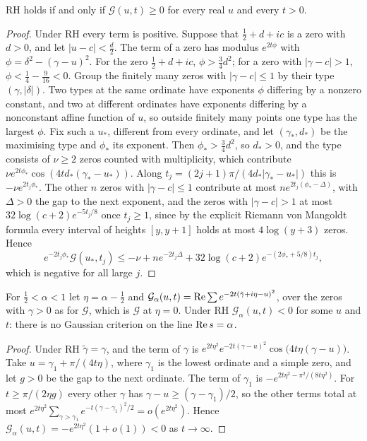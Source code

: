 \begin{proposition}\label{prop:ch12:gauss}
RH holds if and only if $\mathcal G(u,t)\ge0$ for every real $u$ and every $t>0$.
\end{proposition}

\begin{proof}
Under RH every term is positive. Suppose that $\frac12+d+ic$ is a zero with $d>0$, and let $|u-c|<\frac d2$. The term of a zero has modulus $e^{2t\phi}$ with $\phi=\delta^2-(\gamma-u)^2$. For the zero $\frac12+d+ic$, $\phi>\frac34d^2$; for a zero with $|\gamma-c|>1$, $\phi<\frac14-\frac9{16}<0$. Group the finitely many zeros with $|\gamma-c|\le1$ by their type $(\gamma,|\delta|)$. Two types at the same ordinate have exponents $\phi$ differing by a nonzero constant, and two at different ordinates have exponents differing by a nonconstant affine function of $u$, so outside finitely many points one type has the largest $\phi$. Fix such a $u_*$, different from every ordinate, and let $(\gamma_*,d_*)$ be the maximising type and $\phi_*$ its exponent. Then $\phi_*>\frac34d^2$, so $d_*>0$, and the type consists of $\nu\ge2$ zeros counted with multiplicity, which contribute $\nu e^{2t\phi_*}\cos(4td_*(\gamma_*-u_*))$. Along $t_j=(2j+1)\pi/(4d_*|\gamma_*-u_*|)$ this is $-\nu e^{2t_j\phi_*}$. The other $n$ zeros with $|\gamma-c|\le1$ contribute at most $ne^{2t_j(\phi_*-\Delta)}$, with $\Delta>0$ the gap to the next exponent, and the zeros with $|\gamma-c|>1$ at most $32\log(c+2)e^{-5t_j/8}$ once $t_j\ge1$, since by the explicit Riemann von Mangoldt formula every interval of heights $[y,y+1]$ holds at most $4\log(y+3)$ zeros. Hence
\[
e^{-2t_j\phi_*}\mathcal G(u_*,t_j)\le-\nu+ne^{-2t_j\Delta}+32\log(c+2)e^{-(2\phi_*+5/8)t_j},
\]
which is negative for all large $j$.
\end{proof}

\begin{proposition}\label{tx:prop:offline}
For $\frac12<\alpha<1$ let $\eta=\alpha-\frac12$ and $\mathcal G_\alpha(u,t)=\operatorname{Re}\sum e^{-2t(\tilde\gamma+i\eta-u)^2}$, over the zeros with $\gamma>0$ as for $\mathcal G$, which is $\mathcal G$ at $\eta=0$. Under RH $\mathcal G_\alpha(u,t)<0$ for some $u$ and $t$: there is no Gaussian criterion on the line $\operatorname{Re} s=\alpha$.
\end{proposition}

\begin{proof}
Under RH $\tilde\gamma=\gamma$, and the term of $\gamma$ is $e^{2t\eta^2}e^{-2t(\gamma-u)^2}\cos\big(4t\eta(\gamma-u)\big)$. Take $u=\gamma_1+\pi/(4t\eta)$, where $\gamma_1$ is the lowest ordinate and a simple zero, and let $g>0$ be the gap to the next ordinate. The term of $\gamma_1$ is $-e^{2t\eta^2-\pi^2/(8t\eta^2)}$. For $t\ge\pi/(2\eta g)$ every other $\gamma$ has $\gamma-u\ge(\gamma-\gamma_1)/2$, so the other terms total at most $e^{2t\eta^2}\sum_{\gamma>\gamma_1}e^{-t(\gamma-\gamma_1)^2/2}=o(e^{2t\eta^2})$. Hence $\mathcal G_\alpha(u,t)=-e^{2t\eta^2}(1+o(1))<0$ as $t\to\infty$.
\end{proof}


